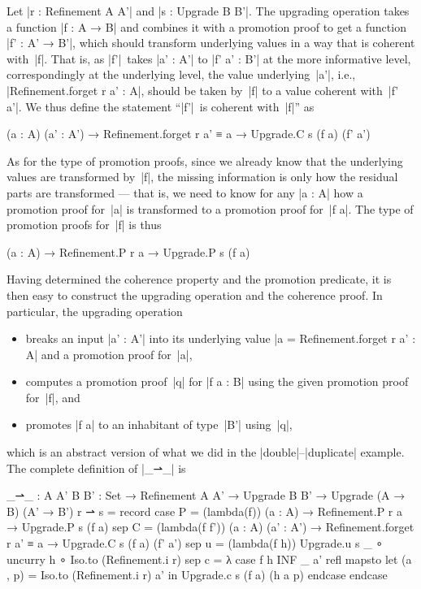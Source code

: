 Let |r : Refinement A A'| and |s : Upgrade B B'|.
The upgrading operation takes a function |f : A → B| and combines it with a promotion proof to get a function |f' : A' → B'|, which should transform underlying values in a way that is coherent with~|f|.
That is, as |f'|~takes |a' : A'| to |f' a' : B'| at the more informative level, correspondingly at the underlying level, the value underlying~|a'|, i.e., |Refinement.forget r a' : A|, should be taken by~|f| to a value coherent with~|f' a'|.
We thus define the statement ``|f'|~is coherent with~|f|'' as
\begin{code}
(a : A) (a' : A') → Refinement.forget r a' ≡ a → Upgrade.C s (f a) (f' a')
\end{code}
As for the type of promotion proofs, since we already know that the underlying values are transformed by~|f|, the missing information is only how the residual parts are transformed --- that is, we need to know for any |a : A| how a promotion proof for~|a| is transformed to a promotion proof for~|f a|.
The type of promotion proofs for~|f| is thus
\begin{code}
(a : A) → Refinement.P r a → Upgrade.P s (f a)
\end{code}
Having determined the coherence property and the promotion predicate, it is then easy to construct the upgrading operation and the coherence proof.
In particular, the upgrading operation
\begin{itemize}
\item breaks an input |a' : A'| into its underlying value |a = Refinement.forget r a' : A| and a promotion proof for~|a|,
\item computes a promotion proof~|q| for |f a : B| using the given promotion proof for~|f|, and
\item promotes |f a| to an inhabitant of type~|B'| using~|q|,
\end{itemize}
which is an abstract version of what we did in the |double|--|duplicate| example.
The complete definition of |_⇀_| is
\begin{code}
_⇀_ :  {A A' B B' : Set} →
       Refinement A A' → Upgrade B B' → Upgrade (A → B) (A' → B')
r ⇀ s = record
  case   P  = (lambda(f)) (a : A) → Refinement.P r a → Upgrade.P s (f a)
  sep    C  = (lambda(f f'))  (a : A) (a' : A') →
                              Refinement.forget r a' ≡ a → Upgrade.C s (f a) (f' a')
  sep    u  = (lambda(f h)) Upgrade.u s _ ∘ uncurry h ∘ Iso.to (Refinement.i r)
  sep    c  = λ case f h INF _ a' refl mapsto  let  (a , p) = Iso.to (Refinement.i r) a'
                                               in   Upgrade.c s (f a) (h a p) endcase endcase
\end{code}

